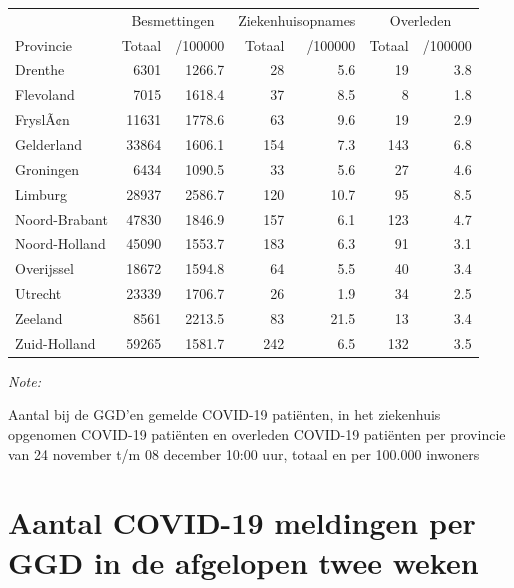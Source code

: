 \documentclass[
  english,
  man,floatsintext]{apa6}
\begin{document}
\begin{table}
\centering
\begin{threeparttable}
\begin{tabular}{lrrrrrr}
\toprule
\multicolumn{1}{c}{ } & \multicolumn{2}{c}{Besmettingen} & \multicolumn{2}{c}{Ziekenhuisopnames} & \multicolumn{2}{c}{Overleden} \\
\cmidrule(l{3pt}r{3pt}){2-3} \cmidrule(l{3pt}r{3pt}){4-5} \cmidrule(l{3pt}r{3pt}){6-7}
Provincie & Totaal & /100000 & Totaal & /100000 & Totaal & /100000\\
\midrule
Drenthe & 6301 & 1266.7 & 28 & 5.6 & 19 & 3.8\\
Flevoland & 7015 & 1618.4 & 37 & 8.5 & 8 & 1.8\\
FryslÃ¢n & 11631 & 1778.6 & 63 & 9.6 & 19 & 2.9\\
Gelderland & 33864 & 1606.1 & 154 & 7.3 & 143 & 6.8\\
Groningen & 6434 & 1090.5 & 33 & 5.6 & 27 & 4.6\\
Limburg & 28937 & 2586.7 & 120 & 10.7 & 95 & 8.5\\
Noord-Brabant & 47830 & 1846.9 & 157 & 6.1 & 123 & 4.7\\
Noord-Holland & 45090 & 1553.7 & 183 & 6.3 & 91 & 3.1\\
Overijssel & 18672 & 1594.8 & 64 & 5.5 & 40 & 3.4\\
Utrecht & 23339 & 1706.7 & 26 & 1.9 & 34 & 2.5\\
Zeeland & 8561 & 2213.5 & 83 & 21.5 & 13 & 3.4\\
Zuid-Holland & 59265 & 1581.7 & 242 & 6.5 & 132 & 3.5\\
\bottomrule
\end{tabular}
\begin{tablenotes}
\item \textit{Note: } 
\item Aantal bij de GGD’en gemelde COVID-19 patiënten, in het ziekenhuis opgenomen COVID-19 patiënten en overleden COVID-19 patiënten per provincie van 24 november t/m 08 december 10:00 uur, totaal en per 100.000 inwoners
\end{tablenotes}
\end{threeparttable}
\end{table}

\newpage

\hypertarget{aantal-covid-19-meldingen-per-ggd-in-de-afgelopen-twee-weken}{%
\section{Aantal COVID-19 meldingen per GGD in de afgelopen twee weken}\label{aantal-covid-19-meldingen-per-ggd-in-de-afgelopen-twee-weken}}
\end{document}
